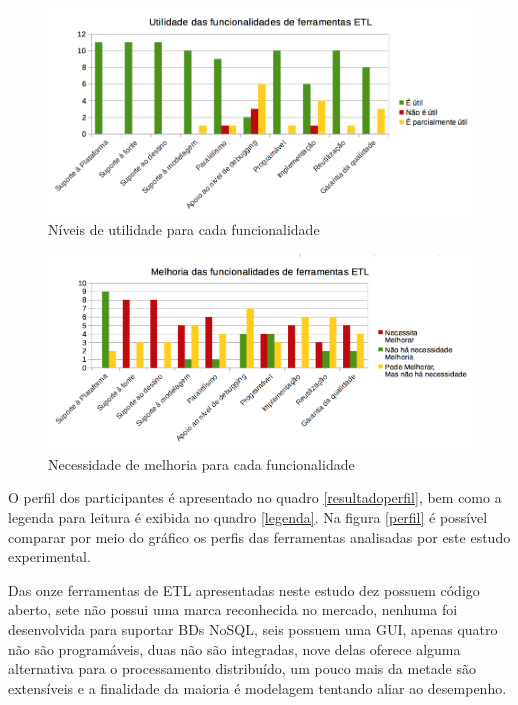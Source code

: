 \begin{figure}[h]
	\centering
	\includegraphics[scale=0.4]{fig/utilidade.png}
	\caption{Níveis de utilidade para cada funcionalidade}
	\label{utilidade}
\end{figure}

\begin{figure}[h]
	\centering
	\includegraphics[scale=0.4]{fig/melhorias.png}
	\caption{Necessidade de melhoria para cada funcionalidade}
	\label{melhoria}
\end{figure}


O perfil dos participantes é apresentado no quadro \ref{resultadoperfil}, bem como a legenda para leitura é exibida no quadro \ref{legenda}. Na figura \ref{perfil} é possível comparar por meio do gráfico os perfis das ferramentas analisadas por este estudo experimental. 

Das onze ferramentas de ETL apresentadas neste estudo dez possuem código aberto, sete não possui uma marca reconhecida no mercado, nenhuma foi desenvolvida para suportar BDs NoSQL, seis possuem uma GUI, apenas quatro não são programáveis, duas não são integradas, nove delas oferece alguma alternativa para o processamento distribuído, um pouco mais da metade são extensíveis e a finalidade da maioria é modelagem tentando aliar ao desempenho.

